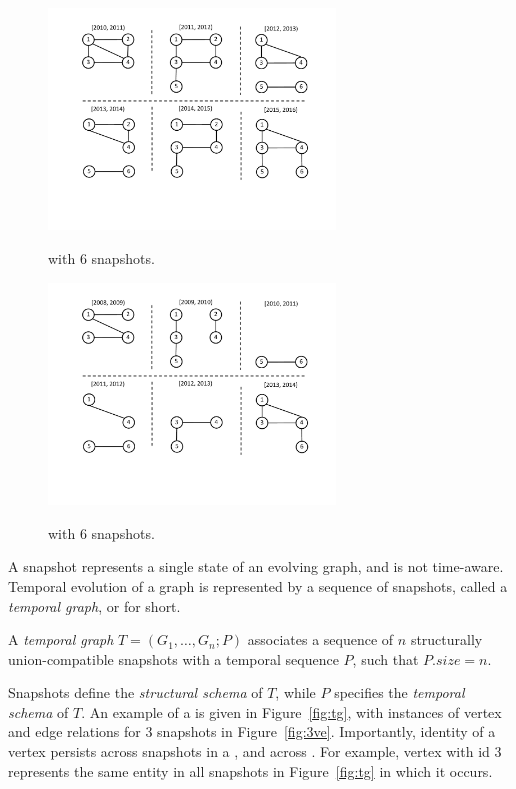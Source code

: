 \begin{figure}[th!]
\centering
\begin{minipage}{3.3in}
  \centering
  \includegraphics[width=3in]{figs/6snaps.pdf}
  \caption{\tg {} with 6 snapshots.}{}
  \label{fig:tg}
\end{minipage}%
\begin{minipage}{3.3in}
  \centering
  \includegraphics[width=3in]{figs/t2.pdf}
  \caption{\tg {} with 6 snapshots.}{}
  \label{fig:tg_t2}
\end{minipage}
\end{figure}


A snapshot represents a single state of an evolving graph, and is not
time-aware.  Temporal evolution of a graph is represented by a
sequence of snapshots, called a {\em temporal graph}, or \tg for
short.

\begin{definition} [TGraph]
A {\em temporal graph} $T = (G_1, \ldots, G_n; P)$ associates a
sequence of $n$ structurally union-compatible snapshots with a
temporal sequence $P$, such that $P.size = n$.
\label{def:tgraph} 
\end{definition}

Snapshots define the {\em structural schema} of $T$, while $P$
specifies the {\em temporal schema} of $T$.
%
An example of a \tg is given in Figure~\ref{fig:tg}, with instances of
vertex and edge relations for 3 snapshots in Figure~\ref{fig:3ve}.
Importantly, identity of a vertex persists across snapshots in a \tg,
and across \tgs.  For example, vertex with id $3$ represents the same
entity in all snapshots in Figure~\ref{fig:tg} in which it occurs.

